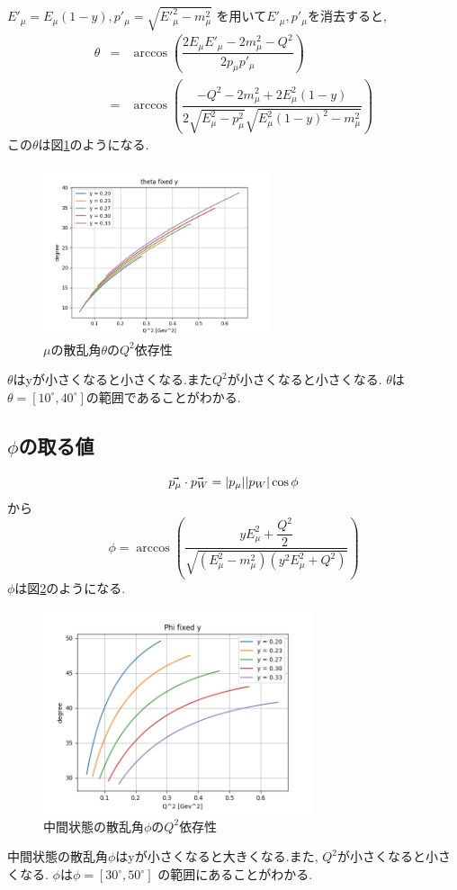 $E'_\mu = E_\mu(1-y), p'_\mu = \sqrt{E'^2_\mu - m^2_\mu}$
を用いて$E'_\mu, p'_\mu$を消去すると, 
\begin{eqnarray}
    \theta & = &\arccos \left( \dfrac {2E_\mu E'_\mu -2m^2_\mu-Q^2}{2p_\mu p'_\mu} \right) \\
    & = & \arccos \left(\dfrac{-Q^2-2m^2_\mu+2E^2_\mu(1-y)}{2\sqrt{E^2_\mu-p^2_\mu}\sqrt{E^2_\mu(1-y)^2-m^2_\mu} }  \right)
\end{eqnarray}
この$\theta$は図\ref{fig:angle3}のようになる.
\begin{figure}[H]
    \centering
    \includegraphics[height=5cm]{img/theta_degree_y_fixed.png}
    \caption{$\mu$の散乱角$\theta$の$Q^2$依存性}
    \label{fig:angle3}
\end{figure}
$\theta$はyが小さくなると小さくなる.また$Q^2$が小さくなると小さくなる.
$\theta$は$\theta=[10^\circ,40^\circ]$の範囲であることがわかる.

\subsection{$\phi$の取る値}
\begin{equation}
    \vec{p_\mu} \cdot \vec{p_W} = |p_\mu| |p_W| \\ \cos\phi
\end{equation}
から
\begin{equation}
    \phi = \arccos \left( \dfrac{yE^2_\mu + \dfrac{Q^2}{2}} {\sqrt{(E^2_\mu - m^2_\mu)(y^2E^2_\mu+Q^2)}} \right)
\end{equation}
$\phi$は図\ref{fig:angle4}のようになる.
\begin{figure}[H]
    \centering
    \includegraphics[width=8cm]{img/Phi_degree_fixed_y.png}
    \caption{中間状態の散乱角$\phi$の$Q^2$依存性}
    \label{fig:angle4}
\end{figure}
中間状態の散乱角$\phi$はyが小さくなると大きくなる.また, $Q^2$が小さくなると小さくなる.
$\phi$は$\phi = [30^\circ, 50^\circ]$ の範囲にあることがわかる.

